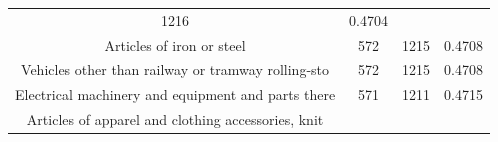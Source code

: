 \documentclass[10pt,]{article}
\begin{document}
\begin{longtable}[]{@{}cccc@{}}
\begin{minipage}[t]{0.20\columnwidth}
1216\strut
\end{minipage} & \begin{minipage}[t]{0.09\columnwidth}\centering\strut
0.4704\strut
\end{minipage}\tabularnewline
\begin{minipage}[t]{0.38\columnwidth}\centering\strut
Articles of iron or steel\strut
\end{minipage} & \begin{minipage}[t]{0.21\columnwidth}\centering\strut
572\strut
\end{minipage} & \begin{minipage}[t]{0.20\columnwidth}\centering\strut
1215\strut
\end{minipage} & \begin{minipage}[t]{0.09\columnwidth}\centering\strut
0.4708\strut
\end{minipage}\tabularnewline
\begin{minipage}[t]{0.38\columnwidth}\centering\strut
Vehicles other than railway or tramway rolling-sto\strut
\end{minipage} & \begin{minipage}[t]{0.21\columnwidth}\centering\strut
572\strut
\end{minipage} & \begin{minipage}[t]{0.20\columnwidth}\centering\strut
1215\strut
\end{minipage} & \begin{minipage}[t]{0.09\columnwidth}\centering\strut
0.4708\strut
\end{minipage}\tabularnewline
\begin{minipage}[t]{0.38\columnwidth}\centering\strut
Electrical machinery and equipment and parts there\strut
\end{minipage} & \begin{minipage}[t]{0.21\columnwidth}\centering\strut
571\strut
\end{minipage} & \begin{minipage}[t]{0.20\columnwidth}\centering\strut
1211\strut
\end{minipage} & \begin{minipage}[t]{0.09\columnwidth}\centering\strut
0.4715\strut
\end{minipage}\tabularnewline
\begin{minipage}[t]{0.38\columnwidth}\centering\strut
Articles of apparel and clothing accessories, knit\strut
\end{minipage} & \begin{minipage}[t]{0.21\columnwidth}\centering\strut

\end{minipage}
\end{longtable}
\end{document}
